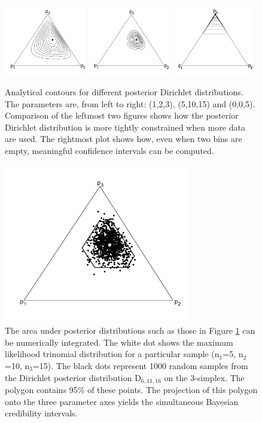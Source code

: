 \documentclass{article}
\begin{document}
\begin{figure}[here]
  \centering
  \includegraphics[width=0.32\textwidth]{7a.pdf}
  \includegraphics[width=0.32\textwidth]{7b.pdf}
  \includegraphics[width=0.32\textwidth]{7c.pdf}
  \caption{
Analytical contours  for different posterior  Dirichlet distributions.
The  parameters  are,  from  left  to right:  (1,2,3),  (5,10,15)  and
(0,0,5).   Comparison  of  the  leftmost  two figures  shows  how  the
posterior Dirichlet distribution is more tightly constrained when more
data are  used. The rightmost plot  shows how, even when  two bins are
empty, meaningful confidence intervals can be computed.}
  \label{ternAnDir}
\end{figure}

\begin{figure}[here]
  \centering
  \includegraphics[width=8cm]{8.pdf}
  \caption{
The  area  under  posterior  distributions  such as  those  in  Figure
\ref{ternAnDir} can  be numerically  integrated.  The white  dot shows
the maximum likelihood trinomial  distribution for a particular sample
(n$_1$=5, n$_2$=10,  n$_3$=15).  The black dots  represent 1000 random
samples from the Dirichlet posterior distribution D$_{6,11,16}$ on the
3-simplex.  The polygon contains  95\% of these points. The projection
of this polygon onto the  three parameter axes yields the simultaneous
Bayesian credibility intervals.}
  \label{terNumDir}
\end{figure}
\end{document}
